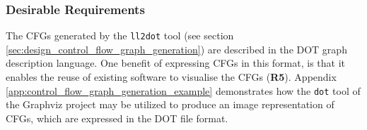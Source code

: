 
\subsubsection{Desirable Requirements}
\label{sec:eval_llvm_ir_library_desirable_requirements}


The CFGs generated by the \texttt{ll2dot} tool (see section \ref{sec:design_control_flow_graph_generation}) are described in the DOT graph description language. One benefit of expressing CFGs in this format, is that it enables the reuse of existing software to visualise the CFGs (\textbf{R5}). Appendix \ref{app:control_flow_graph_generation_example} demonstrates how the \texttt{dot} tool of the Graphviz project may be utilized to produce an image representation of CFGs, which are expressed in the DOT file format.
